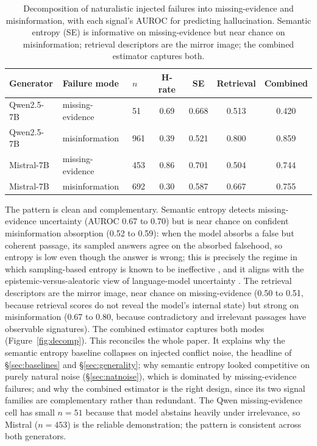 \documentclass[11pt]{article}
\begin{document}
\begin{table}[tbp]
\centering\small
\caption{Decomposition of naturalistic injected failures into
missing-evidence and misinformation, with each signal's AUROC for
predicting hallucination. Semantic entropy (SE) is informative on
missing-evidence but near chance on misinformation; retrieval
descriptors are the mirror image; the combined estimator captures both.}
\label{tab:decomp}
\begin{tabular}{lllcccc}
\toprule
Generator & Failure mode & $n$ & H-rate & SE & Retrieval & Combined \\
\midrule
Qwen2.5-7B & missing-evidence & 51  & 0.69 & 0.668 & 0.513 & 0.420 \\
Qwen2.5-7B & misinformation   & 961 & 0.39 & 0.521 & 0.800 & 0.859 \\
Mistral-7B & missing-evidence & 453 & 0.86 & 0.701 & 0.504 & 0.744 \\
Mistral-7B & misinformation   & 692 & 0.30 & 0.587 & 0.667 & 0.755 \\
\bottomrule
\end{tabular}
\end{table}

The pattern is clean and complementary. Semantic entropy detects
missing-evidence uncertainty (AUROC 0.67 to 0.70) but is near chance on
confident misinformation absorption (0.52 to 0.59): when the model
absorbs a false but coherent passage, its sampled answers agree on the
absorbed falsehood, so entropy is low even though the answer is wrong; this
is precisely the regime in which sampling-based entropy is known to be
ineffective \citep{ma2025semanticenergy}, and it aligns with the
epistemic-versus-aleatoric view of language-model uncertainty
\citep{ahdritz2024knowable}.
The retrieval descriptors are the mirror image, near chance on
missing-evidence (0.50 to 0.51, because retrieval scores do not reveal
the model's internal state) but strong on misinformation (0.67 to 0.80,
because contradictory and irrelevant passages have observable
signatures). The combined estimator captures both modes
(Figure~\ref{fig:decomp}). This reconciles the whole paper. It explains
why the semantic entropy baseline collapses on injected conflict noise,
the headline of \S\ref{sec:baselines} and \S\ref{sec:generality}; why
semantic entropy looked competitive on purely natural noise
(\S\ref{sec:natnoise}), which is dominated by missing-evidence failures;
and why the combined estimator is the right design, since its two
signal families are complementary rather than redundant. The Qwen
missing-evidence cell has small $n = 51$ because that model abstains
heavily under irrelevance, so Mistral ($n = 453$) is the reliable
demonstration; the pattern is consistent across both generators.
\end{document}
